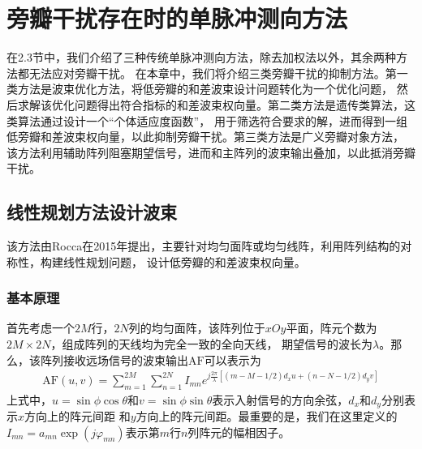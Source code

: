\documentclass[master]{thesis-uestc}
\begin{document}
\chapter{旁瓣干扰存在时的单脉冲测向方法}
在2.3节中，我们介绍了三种传统单脉冲测向方法，除去加权法以外，其余两种方法都无法应对旁瓣干扰。
在本章中，我们将介绍三类旁瓣干扰的抑制方法。第一类方法是波束优化方法，将低旁瓣的和差波束设计问题转化为一个优化问题，
然后求解该优化问题得出符合指标的和差波束权向量。第二类方法是遗传类算法，这类算法通过设计一个“个体适应度函数”，
用于筛选符合要求的解，进而得到一组低旁瓣和差波束权向量，以此抑制旁瓣干扰。第三类方法是广义旁瓣对象方法，
该方法利用辅助阵列阻塞期望信号，进而和主阵列的波束输出叠加，以此抵消旁瓣干扰。

\section{线性规划方法设计波束}
该方法由Rocca在2015年提出\cite{Rocca}，主要针对均匀面阵或均匀线阵，利用阵列结构的对称性，构建线性规划问题，
设计低旁瓣的和差波束权向量。

\subsection{基本原理}
首先考虑一个$2M$行，$2N$列的均匀面阵，该阵列位于$xOy$平面，阵元个数为$2M\times2N$，组成阵列的天线均为完全一致的全向天线，
期望信号的波长为$\lambda$。那么，该阵列接收远场信号的波束输出$\text{AF}$可以表示为
\begin{equation}
    \begin{aligned}
        \text{AF}(u,v) = \sum_{m=1}^{2M}\sum_{n=1}^{2N}I_{mn}
        e^{j\frac{2\pi}{\lambda}\left[\left(m-M-1/2\right)d_xu+\left(n-N-1/2\right)d_yv\right]}
    \end{aligned}
\end{equation}
上式中，$u=\sin\phi\cos\theta$和$v=\sin\phi\sin\theta$表示入射信号的方向余弦，$d_x$和$d_y$分别表示$x$方向上的阵元间距
和$y$方向上的阵元间距。最重要的是，我们在这里定义的$I_{mn}=a_{mn}\exp(j\varphi_{mn})$表示第$m$行$n$列阵元的幅相因子。
\end{document}
